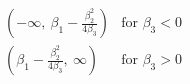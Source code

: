 

\[
\begin{array}{ll}
(-\infty, \ \beta_1-\frac{\beta_2^2}{4\beta_3}) & \mbox{for $\beta_3 < 0$} \\
(\beta_1-\frac{\beta_2^2}{4\beta_3}, \ \infty) & \mbox{for $\beta_3 > 0$} \\
\end{array}
\]


